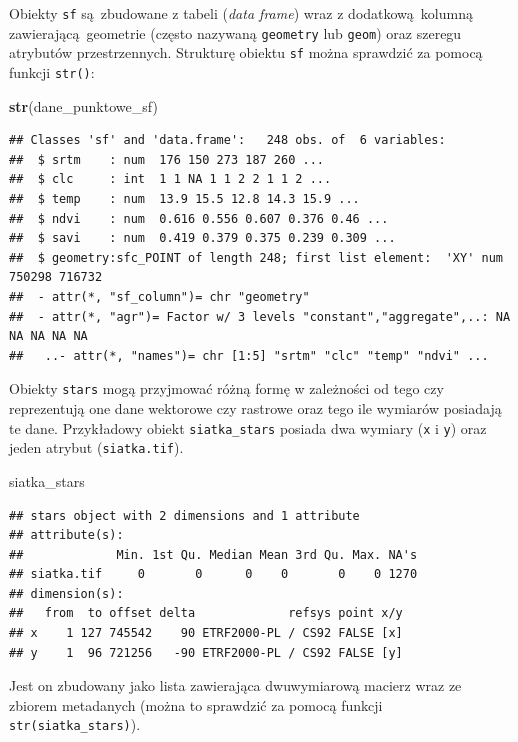 \documentclass[
  paper=6in:9in,pagesize=pdftex,headinclude=on,footinclude=on,10pt]{scrbook}
\newenvironment{Shaded}{\begin{snugshade}}{\end{snugshade}}
\newcommand{\FunctionTok}[1]{\textcolor[rgb]{0.13,0.29,0.53}{\textbf{#1}}}
\newcommand{\NormalTok}[1]{#1}
\begin{document}
Obiekty \texttt{sf} są~zbudowane z tabeli (\emph{data frame}) wraz z dodatkową~kolumną zawierającą~geometrie (często nazywaną \texttt{geometry} lub \texttt{geom}) oraz szeregu atrybutów przestrzennych.
Strukturę obiektu \texttt{sf} można sprawdzić za pomocą funkcji \texttt{str()}:

\begin{Shaded}
\begin{Highlighting}[]
\FunctionTok{str}\NormalTok{(dane\_punktowe\_sf)}
\end{Highlighting}
\end{Shaded}

\begin{verbatim}
## Classes 'sf' and 'data.frame':   248 obs. of  6 variables:
##  $ srtm    : num  176 150 273 187 260 ...
##  $ clc     : int  1 1 NA 1 1 2 2 1 1 2 ...
##  $ temp    : num  13.9 15.5 12.8 14.3 15.9 ...
##  $ ndvi    : num  0.616 0.556 0.607 0.376 0.46 ...
##  $ savi    : num  0.419 0.379 0.375 0.239 0.309 ...
##  $ geometry:sfc_POINT of length 248; first list element:  'XY' num  750298 716732
##  - attr(*, "sf_column")= chr "geometry"
##  - attr(*, "agr")= Factor w/ 3 levels "constant","aggregate",..: NA NA NA NA NA
##   ..- attr(*, "names")= chr [1:5] "srtm" "clc" "temp" "ndvi" ...
\end{verbatim}

Obiekty \texttt{stars} mogą przyjmować różną formę w zależności od tego czy reprezentują one dane wektorowe czy rastrowe oraz tego ile wymiarów posiadają te dane.
Przykładowy obiekt \texttt{siatka\_stars} posiada dwa wymiary (\texttt{x} i \texttt{y}) oraz jeden atrybut (\texttt{siatka.tif}).

\begin{Shaded}
\begin{Highlighting}[]
\NormalTok{siatka\_stars}
\end{Highlighting}
\end{Shaded}

\begin{verbatim}
## stars object with 2 dimensions and 1 attribute
## attribute(s):
##             Min. 1st Qu. Median Mean 3rd Qu. Max. NA's
## siatka.tif     0       0      0    0       0    0 1270
## dimension(s):
##   from  to offset delta             refsys point x/y
## x    1 127 745542    90 ETRF2000-PL / CS92 FALSE [x]
## y    1  96 721256   -90 ETRF2000-PL / CS92 FALSE [y]
\end{verbatim}

Jest on zbudowany jako lista zawierająca dwuwymiarową macierz wraz ze zbiorem metadanych (można to sprawdzić za pomocą funkcji \texttt{str(siatka\_stars)}).
\end{document}
